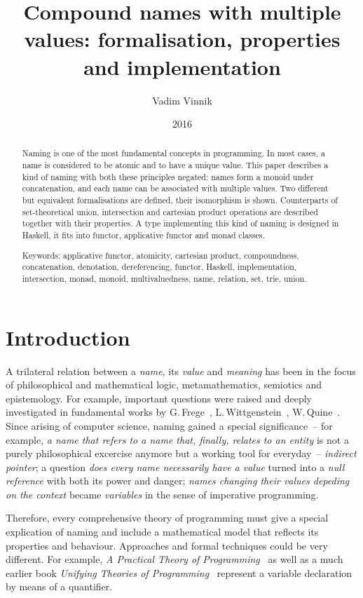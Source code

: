 \documentclass{article}
\title{Compound names with multiple values: formalisation, properties and implementation}
\author{Vadim Vinnik}
\date{2016}
\theoremstyle{definition}
\begin{document}
\maketitle

\begin{abstract}
Naming is one of the most fundamental concepts in programming.  In most
cases, a name is considered to be atomic and to have a unique value.  This
paper describes a kind of naming with both these principles negated: names form
a monoid under concatenation, and each name can be associated with multiple
values.  Two different but equivalent formalisations are defined, their
isomorphism is shown.  Counterparts of set-theoretical union, intersection and
cartesian product operations are described together with their properties.  A
type implementing this kind of naming is designed in Haskell, it fits into
functor, applicative functor and monad classes.

Keywords:
applicative functor,
atomicity,
cartesian product,
compoundness,
concatenation,
denotation,
dereferencing,
functor,
Haskell,
implementation,
intersection,
monad,
monoid,
multivaluedness,
name,
relation,
set,
trie,
union.
\end{abstract}

\tableofcontents



\section{Introduction}

A trilateral relation between a \emph{name}, its \emph{value} and
\emph{meaning} has been in the focus of philosophical and mathematical logic,
metamathematics, semiotics and epistemology.  For example, important questions
were raised and deeply investigated in fundamental works by
G.\,Frege~\cite{bib:frege},
L.\,Wittgenstein~\cite{bib:wittgenstein},
W.\,Quine~\cite{bib:quine}.
Since arising of computer science, naming gained a special significance~-- for
example, \emph{a name that refers to a name that, finally, relates to an
entity} is not a purely philosophical excercise anymore but a working tool for
everyday~-- \emph{indirect pointer}; a question \emph{does every name
necessarily have a value} turned into a \emph{null reference} with both its
power and danger; \emph{names changing their values depeding on the context}
became \emph{variables} in the sense of imperative programming.

Therefore, every comprehensive theory of programming must give a special
explication of naming and include a mathematical model that reflects its
properties and behaviour.  Approaches and formal techniques could be very
different.  For example, \emph{A Practical Theory of
Programming}~\cite{bib:ptop} as well as a much earlier book \emph{Unifying
Theories of Programming}~\cite{bib:utp} represent a variable declaration by
means of a quantifier.
\end{document}
